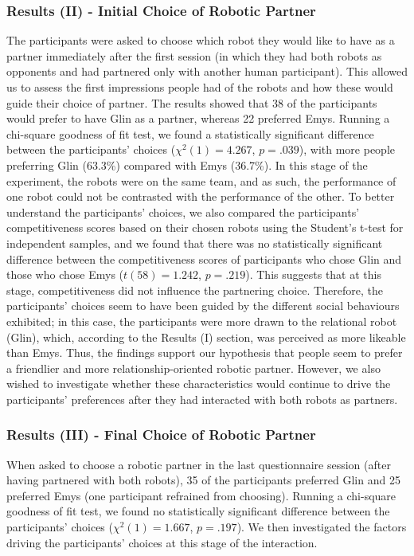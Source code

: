 \subsubsection{Results (II) - Initial Choice of Robotic Partner}
The participants were asked to choose which robot they would like to have as a partner immediately after the first session (in which they had both robots as opponents and had partnered only with another human participant). This allowed us to assess the first impressions people had of the robots and how these would guide their choice of partner. The results showed that 38 of the participants would prefer to have Glin as a partner, whereas 22 preferred Emys. Running a chi-square goodness of fit test, we found a statistically significant difference between the participants' choices (${\chi^2}(1)=4.267$, $p=.039$), with more people preferring Glin (63.3\%) compared with Emys (36.7\%). In this stage of the experiment, the robots were on the same team, and as such, the performance of one robot could not be contrasted with the performance of the other. 
To better understand the participants' choices, we also compared the participants' competitiveness scores based on their chosen robots using the Student's t-test for independent samples, and we found that there was no statistically significant difference between the competitiveness scores of participants who chose Glin and those who chose Emys ($t(58)=1.242$, $p=.219$). This suggests that at this stage, competitiveness did not influence the partnering choice.
Therefore, the participants' choices seem to have been guided by the different social behaviours exhibited; in this case, the participants were more drawn to the relational robot (Glin), which, according to the Results (I) section, was perceived as more likeable than Emys. Thus, the findings support our hypothesis that people seem to prefer a friendlier and more relationship-oriented robotic partner.
However, we also wished to investigate whether these characteristics would continue to drive the participants' preferences after they had interacted with both robots as partners.


\subsubsection{Results (III) - Final Choice of Robotic Partner}
When asked to choose a robotic partner in the last questionnaire session (after having partnered with both robots), 35 of the participants preferred Glin and 25 preferred Emys (one participant refrained from choosing).
Running a chi-square goodness of fit test, we found no statistically significant difference between the participants' choices (${\chi^2}(1)=1.667$, $p=.197$).
We then investigated the factors driving the participants' choices at this stage of the interaction.

